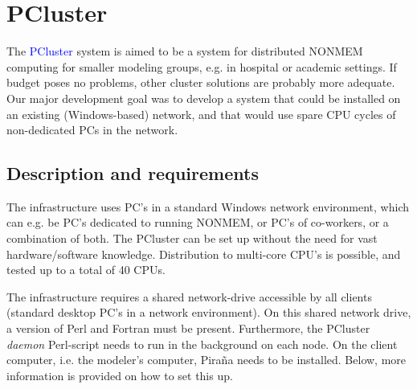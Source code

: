 \documentclass[a4,11pt]{report} \usepackage[pdftex]{graphicx}
\begin{document}
{{\section{PCluster} The \textcolor{Blue}{PCluster} system is aimed to
be a system for distributed NONMEM computing for smaller modeling
groups, e.g. in hospital or academic settings. If budget poses no
problems, other cluster solutions are probably more adequate. Our major development goal
was to develop a system that could be installed on an existing
(Windows-based) network, and that would use spare CPU cycles of
non-dedicated PCs in the network.

\subsection{Description and requirements} The infrastructure uses
PC's in a standard Windows network environment, which can e.g. be PC's
dedicated to running NONMEM, or PC's of co-workers, or a combination
of both. The PCluster can be set up without the need for vast
hardware/software knowledge. Distribution to multi-core CPU's is
possible, and tested up to a total of 40 CPUs.

The infrastructure requires a shared network-drive accessible by all
clients (standard desktop PC's in a network environment). On this
shared network drive, a version of Perl and Fortran must be
present. Furthermore, the PCluster \textit{daemon} Perl-script
needs to run in the background on each node. On
the client computer, i.e. the modeler's computer, Pira\~na needs to be
installed. Below, more information is provided on how to set this up.

}}
\end{document}
